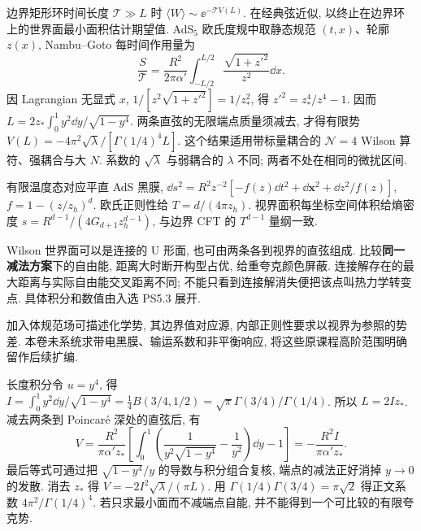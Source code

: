 \label{ch:Wilson}
边界矩形环时间长度 $\mathcal T\gg L$ 时 $\langle W\rangle\sim\ee^{-\mathcal TV(L)}$. 在经典弦近似, 以终止在边界环上的世界面最小面积估计期望值. AdS$_5$ 欧氏度规中取静态规范 $(t,x)$、轮廓 $z(x)$, Nambu--Goto 每时间作用量为
\begin{equation}
\frac S{\mathcal T}=\frac{R^2}{2\pi\alpha'}\int_{-L/2}^{L/2}
\frac{\sqrt{1+z'^2}}{z^2}\dd x.
\end{equation}
因 Lagrangian 无显式 $x$, $1/[z^2\sqrt{1+z'^2}]=1/z_*^2$, 得 $z'^2=z_*^4/z^4-1$. 因而 $L=2z_*\int_0^1y^2\dd y/\sqrt{1-y^4}$. 两条直弦的无限端点质量须减去, 才得有限势
$V(L)=-4\pi^2\sqrt\lambda/[\Gamma(1/4)^4L]$.
这个结果适用带标量耦合的 $\mathcal N=4$ Wilson 算符、强耦合与大 $N$. 系数的 $\sqrt\lambda$ 与弱耦合的 $\lambda$ 不同; 两者不处在相同的微扰区间.

有限温度态对应平直 AdS 黑膜, $\dd s^2=R^2z^{-2}[-f(z)\dd t^2+\dd\boldsymbol x^2+\dd z^2/f(z)]$, $f=1-(z/z_h)^d$. 欧氏正则性给 $T=d/(4\pi z_h)$. 视界面积每坐标空间体积给熵密度 $s=R^{d-1}/(4G_{d+1}z_h^{d-1})$, 与边界 CFT 的 $T^{d-1}$ 量纲一致.

Wilson 世界面可以是连接的 U 形面, 也可由两条各到视界的直弦组成. 比较\textbf{同一减法方案}下的自由能, 距离大时断开构型占优, 给重夸克颜色屏蔽. 连接解存在的最大距离与实际自由能交叉距离不同; 不能只看到连接解消失便把该点叫热力学转变点. 具体积分和数值由入选 PS5.3 展开.

加入体规范场可描述化学势, 其边界值对应源, 内部正则性要求以视界为参照的势差. 本卷未系统求带电黑膜、输运系数和非平衡响应, 将这些原课程高阶范围明确留作后续扩编.

长度积分令 $u=y^4$, 得 $I=\int_0^1y^2\dd y/\sqrt{1-y^4}=\frac14B(3/4,1/2)=\sqrt\pi\Gamma(3/4)/\Gamma(1/4)$. 所以 $L=2Iz_*$. 减去两条到 Poincaré 深处的直弦后, 有
\[
V=\frac{R^2}{\pi\alpha'z_*}
\left[\int_0^1\left(\frac1{y^2\sqrt{1-y^4}}-\frac1{y^2}\right)\dd y-1\right]
=-\frac{R^2I}{\pi\alpha'z_*}.
\]
最后等式可通过把 $\sqrt{1-y^4}/y$ 的导数与积分组合复核, 端点的减法正好消掉 $y\to0$ 的发散. 消去 $z_*$ 得 $V=-2I^2\sqrt\lambda/(\pi L)$. 用 $\Gamma(1/4)\Gamma(3/4)=\pi\sqrt2$ 得正文系数 $4\pi^2/\Gamma(1/4)^4$. 若只求最小面而不减端点自能, 并不能得到一个可比较的有限夸克势.
